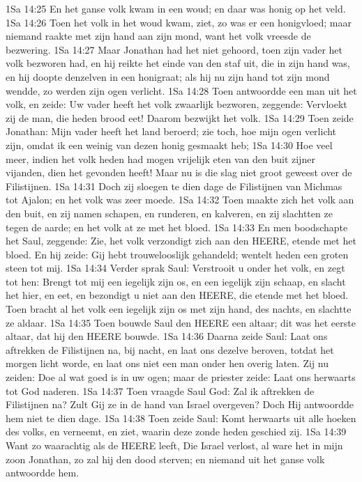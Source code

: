 1Sa 14:25  En het ganse volk kwam in een woud; en daar was honig op het veld.
1Sa 14:26  Toen het volk in het woud kwam, ziet, zo was er een honigvloed; maar niemand raakte met zijn hand aan zijn mond, want het volk vreesde de bezwering.
1Sa 14:27  Maar Jonathan had het niet gehoord, toen zijn vader het volk bezworen had, en hij reikte het einde van den staf uit, die in zijn hand was, en hij doopte denzelven in een honigraat; als hij nu zijn hand tot zijn mond wendde, zo werden zijn ogen verlicht.
1Sa 14:28  Toen antwoordde een man uit het volk, en zeide: Uw vader heeft het volk zwaarlijk bezworen, zeggende: Vervloekt zij de man, die heden brood eet! Daarom bezwijkt het volk.
1Sa 14:29  Toen zeide Jonathan: Mijn vader heeft het land beroerd; zie toch, hoe mijn ogen verlicht zijn, omdat ik een weinig van dezen honig gesmaakt heb;
1Sa 14:30  Hoe veel meer, indien het volk heden had mogen vrijelijk eten van den buit zijner vijanden, dien het gevonden heeft! Maar nu is die slag niet groot geweest over de Filistijnen.
1Sa 14:31  Doch zij sloegen te dien dage de Filistijnen van Michmas tot Ajalon; en het volk was zeer moede.
1Sa 14:32  Toen maakte zich het volk aan den buit, en zij namen schapen, en runderen, en kalveren, en zij slachtten ze tegen de aarde; en het volk at ze met het bloed.
1Sa 14:33  En men boodschapte het Saul, zeggende: Zie, het volk verzondigt zich aan den HEERE, etende met het bloed. En hij zeide: Gij hebt trouwelooslijk gehandeld; wentelt heden een groten steen tot mij.
1Sa 14:34  Verder sprak Saul: Verstrooit u onder het volk, en zegt tot hen: Brengt tot mij een iegelijk zijn os, en een iegelijk zijn schaap, en slacht het hier, en eet, en bezondigt u niet aan den HEERE, die etende met het bloed. Toen bracht al het volk een iegelijk zijn os met zijn hand, des nachts, en slachtte ze aldaar.
1Sa 14:35  Toen bouwde Saul den HEERE een altaar; dit was het eerste altaar, dat hij den HEERE bouwde.
1Sa 14:36  Daarna zeide Saul: Laat ons aftrekken de Filistijnen na, bij nacht, en laat ons dezelve beroven, totdat het morgen licht worde, en laat ons niet een man onder hen overig laten. Zij nu zeiden: Doe al wat goed is in uw ogen; maar de priester zeide: Laat ons herwaarts tot God naderen.
1Sa 14:37  Toen vraagde Saul God: Zal ik aftrekken de Filistijnen na? Zult Gij ze in de hand van Israel overgeven? Doch Hij antwoordde hem niet te dien dage.
1Sa 14:38  Toen zeide Saul: Komt herwaarts uit alle hoeken des volks, en verneemt, en ziet, waarin deze zonde heden geschied zij.
1Sa 14:39  Want zo waarachtig als de HEERE leeft, Die Israel verlost, al ware het in mijn zoon Jonathan, zo zal hij den dood sterven; en niemand uit het ganse volk antwoordde hem.

